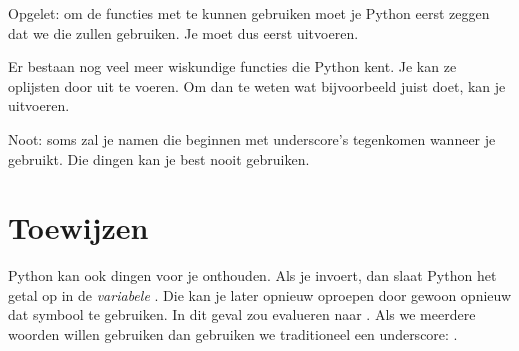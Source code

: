   Opgelet: om de functies met  te kunnen gebruiken moet je Python
  eerst zeggen dat we die zullen gebruiken. Je moet dus eerst 
  uitvoeren.

  Er bestaan nog veel meer wiskundige functies die Python kent. Je kan ze
  oplijsten door  uit te voeren. Om dan te weten wat bijvoorbeeld
   juist doet, kan je  uitvoeren.

  Noot: soms zal je namen die beginnen met underscore's tegenkomen wanneer je
   gebruikt. Die dingen kan je best nooit gebruiken.
\section{Toewijzen}
  Python kan ook dingen voor je onthouden. Als je  invoert,
  dan slaat Python het getal  op in de \emph{variabele} .
  Die kan je later opnieuw oproepen door gewoon opnieuw dat symbool te
  gebruiken. In dit geval zou  evalueren naar .
  Als we meerdere woorden willen gebruiken dan gebruiken we traditioneel een
  underscore: .

